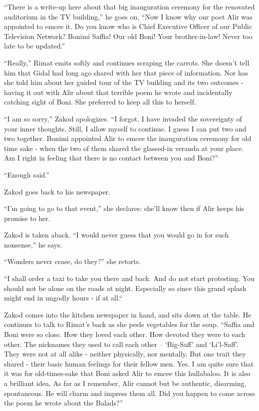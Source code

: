 \documentclass[twoside,11pt]{book}
\begin{document}
``There is a write-up here about that big inauguration ceremony for the renovated auditorium in the TV
building,'' he goes on, ``Now I know why our poet Alir was appointed to emcee it. Do you know who is Chief Executive
Officer of our Public Television Network? Bonimi Saffia! Our old Boni! Your brother-in-law! Never too late to be
updated.''

``Really,'' Rimat emits softly and continues scraping the carrots. She doesn't tell him that
Gidal had long ago shared with her that piece of information. Nor has she told him about her guided tour of the TV
building and its two outcomes - having it out with Alir about that terrible poem he wrote and incidentally catching
sight of Boni. She preferred to keep all this to herself.

``I am so sorry,'' Zakod apologizes. ``I forgot. I have invaded the sovereignty
of your inner thoughts. Still, I allow myself to continue. I guess I can put two and two together. Bonimi appointed
Alir to emcee the inauguration ceremony for old time sake - when the two of them shared the glassed-in veranda at your
place. Am I right in feeling that there is no contact between you and Boni?''

``Enough said.''

Zakod goes back to his newspaper.

``I'm going to go to that event,'' she declares: she'll know then if Alir keeps his
promise to her.

Zakod is taken aback. ``I would never guess that you would go in for such nonsense,'' he says.

``Wonders never cease, do they?'' she retorts.

``I shall order a taxi to take you there and back. And do not start protesting. You should not be alone on
the roads at night.  Especially so since this grand splash might end in ungodly hours - if at all.``

Zakod comes into the kitchen newspaper in hand, and sits down at the table. He continues to talk to Rimat's back as she
peels vegetables for the soup. ``Saffia and Boni were so close. How they loved each other. How devoted
they were to each other. The nicknames they used to call each other -- `Big-Saff' and `Li'l-Saff'.
They were not at all alike - neither physically, nor mentally. But one trait they shared -
their basic human feelings for their fellow men. Yes. I am quite sure that
it was for old-times-sake that Boni asked Alir to emcee this hullabaloo. It is also a brilliant idea. As far as I
remember, Alir cannot but be authentic, disarming, spontaneous. He will charm and impress them all. Did you happen to
come across the poem he wrote about the Balads?''
\end{document}
